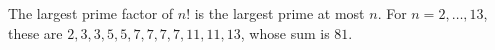 The largest prime factor of $n!$ is the largest prime at most $n$. For $n=2,\ldots,13$, these are $2,3,3,5,5,7,7,7,7,11,11,13$, whose sum is $\boxed{81}$.
